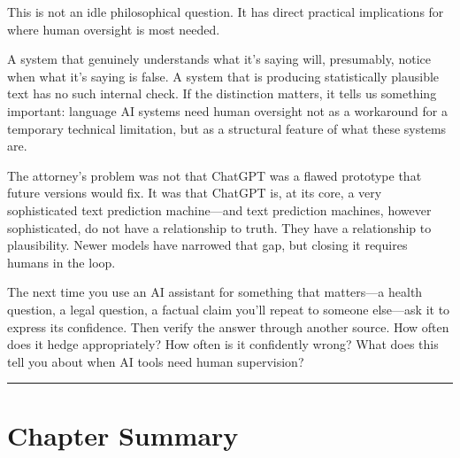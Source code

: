 This is not an idle philosophical question. It has direct practical implications for where human oversight is most needed.

A system that genuinely understands what it's saying will, presumably, notice when what it's saying is false. A system that is producing statistically plausible text has no such internal check. If the distinction matters, it tells us something important: language AI systems need human oversight not as a workaround for a temporary technical limitation, but as a structural feature of what these systems are.

The attorney's problem was not that ChatGPT was a flawed prototype that future versions would fix. It was that ChatGPT is, at its core, a very sophisticated text prediction machine---and text prediction machines, however sophisticated, do not have a relationship to truth. They have a relationship to plausibility. Newer models have narrowed that gap, but closing it requires humans in the loop.

\begin{trythis}
The next time you use an AI assistant for something that matters---a health question, a legal question, a factual claim you'll repeat to someone else---ask it to express its confidence. Then verify the answer through another source. How often does it hedge appropriately? How often is it confidently wrong? What does this tell you about when AI tools need human supervision?
\end{trythis}

\bigskip
\begin{center}
\rule{0.5\textwidth}{0.4pt}
\end{center}
\bigskip

\section*{Chapter Summary}

